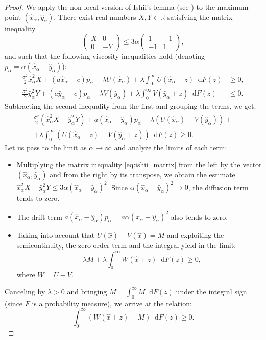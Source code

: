 \documentclass[smallextended]{svjour3}
\providecommand{\diff}{\mathop{}\!\mathrm{d}}
\begin{document}
\begin{proof}
We apply the non-local version of Ishii's lemma (see \cite[Theorem 1]{Barles2008}) to the maximum point $(\hat{x}_\alpha, \hat{y}_\alpha)$. There exist real numbers $X, Y \in \mathbb{R}$ satisfying the matrix inequality
\begin{equation}
\label{eq:ishii_matrix}
\begin{pmatrix} X & 0 \\ 0 & -Y \end{pmatrix} \le 3\alpha \begin{pmatrix} 1 & -1 \\ -1 & 1 \end{pmatrix},
\end{equation}
and such that the following viscosity inequalities hold (denoting $p_\alpha = \alpha(\hat{x}_\alpha - \hat{y}_\alpha)$):
\begin{align*}
\frac{\sigma^2}{2} \hat{x}_\alpha^2 X + (a \hat{x}_\alpha - c)p_\alpha - \lambda U(\hat{x}_\alpha) + \lambda \int_0^\infty U(\hat{x}_\alpha+z) \diff F(z) &\ge 0, \\
\frac{\sigma^2}{2} \hat{y}_\alpha^2 Y + (a \hat{y}_\alpha - c)p_\alpha - \lambda V(\hat{y}_\alpha) + \lambda \int_0^\infty V(\hat{y}_\alpha+z) \diff F(z) &\le 0.
\end{align*}
Subtracting the second inequality from the first and grouping the terms, we get:
\begin{multline*}
\frac{\sigma^2}{2} (\hat{x}_\alpha^2 X - \hat{y}_\alpha^2 Y) + a(\hat{x}_\alpha - \hat{y}_\alpha)p_\alpha - \lambda (U(\hat{x}_\alpha) - V(\hat{y}_\alpha)) + \\
+ \lambda \int_0^\infty (U(\hat{x}_\alpha+z) - V(\hat{y}_\alpha+z)) \diff F(z) \ge 0.
\end{multline*}
Let us pass to the limit as $\alpha \to \infty$ and analyze the limits of each term:
\begin{itemize}
    \item Multiplying the matrix inequality \eqref{eq:ishii_matrix} from the left by the vector $(\hat{x}_\alpha, \hat{y}_\alpha)$ and from the right by its transpose, we obtain the estimate $\hat{x}_\alpha^2 X - \hat{y}_\alpha^2 Y \le 3\alpha(\hat{x}_\alpha - \hat{y}_\alpha)^2$. Since $\alpha(\hat{x}_\alpha - \hat{y}_\alpha)^2 \to 0$, the diffusion term tends to zero.
    \item The drift term $a (\hat{x}_\alpha - \hat{y}_\alpha)p_\alpha = a\alpha(\hat{x}_\alpha - \hat{y}_\alpha)^2$ also tends to zero.
    \item Taking into account that $U(\hat{x}) - V(\hat{x}) = M$ and exploiting the semicontinuity, the zero-order term and the integral yield in the limit:
    $$ -\lambda M + \lambda \int_0^\infty W(\hat{x}+z) \diff F(z) \ge 0, $$
    where $W = U - V$.
\end{itemize}
Canceling by $\lambda > 0$ and bringing $M = \int_0^\infty M \diff F(z)$ under the integral sign (since $F$ is a probability measure), we arrive at the relation:
$$ \int_0^\infty (W(\hat{x}+z) - M) \diff F(z) \ge 0. $$


\end{proof}
\end{document}
